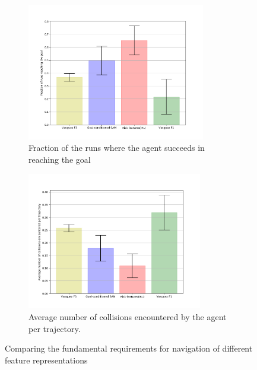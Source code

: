 \begin{figure}[!htbp]
	\begin{subfigure}{.5\textwidth}
		\centering
		\includegraphics[width=\linewidth, height=6cm]{plots/plot_without_outliers/ucy_inter_irl_no_outliers/goal_reached_ucy_no_outlier_inter_irl.png}
		\caption{Fraction of the runs where the agent succeeds in reaching the goal}
		\label{fig:inter_IRL-goal_reached}
	\end{subfigure}
	\begin{subfigure}{.5\textwidth}
		\centering
		\includegraphics[width=\linewidth, height=6cm]{plots/plot_without_outliers/ucy_inter_irl_no_outliers/count_collisions_ucy_no_outlier_inter_irl.png}
		\caption{Average number of collisions encountered by the agent per trajectory.}
		\label{fig:inter_IRL-collision_counts}
	\end{subfigure}
	\caption{Comparing the fundamental requirements for navigation of different feature representations }
\end{figure}

